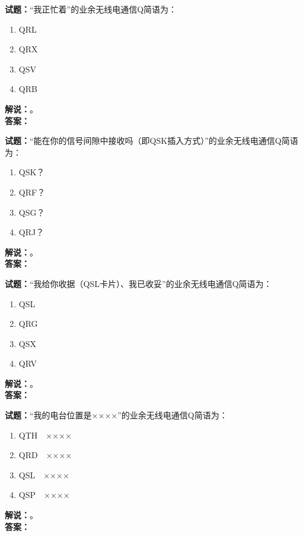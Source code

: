 \documentclass{ctexbook}
\begin{document}
\vspace{\baselineskip}

\noindent\textbf{试题：}“我正忙着”的业余无线电通信Q简语为：
\begin{enumerate}[leftmargin=3em]
  \item QRL
  \item QRX
  \item QSV
  \item QRB
\end{enumerate}
\noindent\textbf{解说：}\textbf{}。\\\noindent\textbf{答案：}

\vspace{\baselineskip}

\noindent\textbf{试题：}“能在你的信号间隙中接收吗（即QSK插入方式）”的业余无线电通信Q简语为：
\begin{enumerate}[leftmargin=3em]
  \item QSK？
  \item QRF？
  \item QSG？
  \item QRJ？
\end{enumerate}
\noindent\textbf{解说：}\textbf{}。\\\noindent\textbf{答案：}

\vspace{\baselineskip}

\noindent\textbf{试题：}“我给你收据（QSL卡片）、我已收妥”的业余无线电通信Q简语为：
\begin{enumerate}[leftmargin=3em]
  \item QSL
  \item QRG
  \item QSX
  \item QRV
\end{enumerate}
\noindent\textbf{解说：}\textbf{}。\\\noindent\textbf{答案：}

\vspace{\baselineskip}

\noindent\textbf{试题：}“我的电台位置是××××”的业余无线电通信Q简语为：
\begin{enumerate}[leftmargin=3em]
  \item QTH　××××
  \item QRD　××××
  \item QSL　××××
  \item QSP　××××
\end{enumerate}
\noindent\textbf{解说：}\textbf{}。\\\noindent\textbf{答案：}
\end{document}
